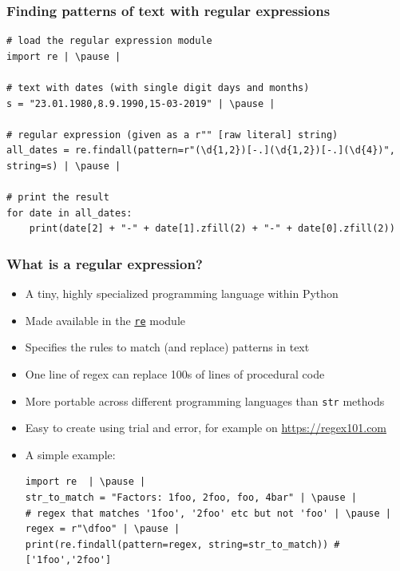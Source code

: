 \documentclass[xcolor=table]{beamer}
\begin{document}
\begin{frame}[fragile]
\frametitle{Finding patterns of text with regular expressions}
\begin{lstlisting}[style=python]
# load the regular expression module
import re | \pause |

# text with dates (with single digit days and months)
s = "23.01.1980,8.9.1990,15-03-2019" | \pause |

# regular expression (given as a r"" [raw literal] string)
all_dates = re.findall(pattern=r"(\d{1,2})[-.](\d{1,2})[-.](\d{4})", string=s) | \pause |

# print the result
for date in all_dates:
    print(date[2] + "-" + date[1].zfill(2) + "-" + date[0].zfill(2)) 
\end{lstlisting}
\end{frame}
\begin{frame}[fragile]
\frametitle{What is a regular expression?}
    \begin{itemize}
        \item A tiny, highly specialized programming language within Python \pause 
        \item Made available in the \href{https://docs.python.org/3.7/library/re.html#module-re}{\texttt{re}} module \pause
        \item Specifies the rules to match (and replace) patterns in text \pause 
        \item One line of regex can replace 100s of lines of procedural code \pause 
        \item More portable across different programming languages than \texttt{str} methods \pause 
        \item Easy to create using trial and error, for example on \url{https://regex101.com} \pause 
        \item A simple example:
\begin{lstlisting}[style=python]
import re  | \pause |
str_to_match = "Factors: 1foo, 2foo, foo, 4bar" | \pause |
# regex that matches '1foo', '2foo' etc but not 'foo' | \pause |
regex = r"\dfoo" | \pause |  
print(re.findall(pattern=regex, string=str_to_match)) # ['1foo','2foo']
\end{lstlisting}
    \end{itemize}
\end{frame}
\end{document}
